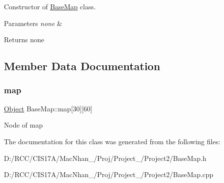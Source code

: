 Constructor of \hyperlink{class_base_map}{Base\+Map} class. 


\begin{DoxyParams}{Parameters}
{\em none} & \\
\hline
\end{DoxyParams}
\begin{DoxyReturn}{Returns}
none 
\end{DoxyReturn}


\subsection{Member Data Documentation}
\mbox{\label{class_base_map_a1d9ea4ce08a8bbd32ac24ccead7a546d}} 
\subsubsection{\texorpdfstring{map}{map}}
{\footnotesize\ttfamily \hyperlink{class_object}{Object} Base\+Map\+::map\mbox{[}30\mbox{]}\mbox{[}60\mbox{]}}

Node of map 

The documentation for this class was generated from the following files\+:\begin{DoxyCompactItemize}
\item 
D\+:/\+R\+C\+C/\+C\+I\+S17\+A/\+Mac\+Nhan\+\_/\+Proj/\+Project\+\_/\+Project2/Base\+Map.\+h\item 
D\+:/\+R\+C\+C/\+C\+I\+S17\+A/\+Mac\+Nhan\+\_/\+Proj/\+Project\+\_/\+Project2/Base\+Map.\+cpp\end{DoxyCompactItemize}
